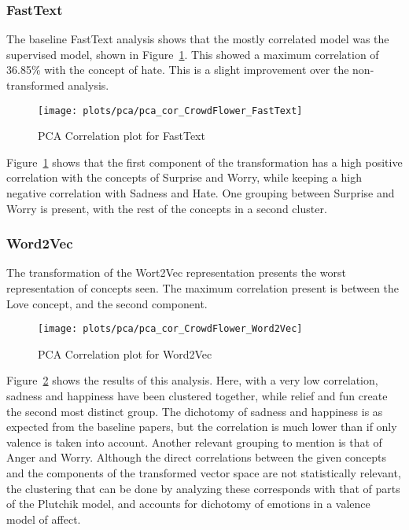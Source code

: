 \subsubsection{FastText}
The baseline FastText analysis shows that the mostly correlated model was the supervised model, shown in Figure~\ref{fig:pca_cor_CrowdFlower_FastText}. This showed a maximum correlation of 36.85\% with the concept of hate. This is a slight improvement over the non-transformed analysis.
\begin{figure}[H]
  \texttt{[image: plots/pca/pca\_cor\_CrowdFlower\_FastText]}
  \centering
  \caption{PCA Correlation plot for FastText}\label{fig:pca_cor_CrowdFlower_FastText}
\end{figure}
Figure~\ref{fig:pca_cor_CrowdFlower_FastText} shows that the first component of the transformation has a high positive correlation with the concepts of Surprise and Worry, while keeping a high negative correlation with Sadness and Hate. One grouping between Surprise and Worry is present, with the rest of the concepts in a second cluster.

\subsubsection{Word2Vec}
The transformation of the Wort2Vec representation presents the worst representation of concepts seen. The maximum correlation present is between the Love concept, and the second component.
\begin{figure}[H]
  \texttt{[image: plots/pca/pca\_cor\_CrowdFlower\_Word2Vec]}
  \centering
  \caption{PCA Correlation plot for Word2Vec}\label{fig:pca_cor_CrowdFlower_Word2Vec}
\end{figure}
Figure~\ref{fig:pca_cor_CrowdFlower_Word2Vec} shows the results of this analysis. Here, with a very low correlation, sadness and happiness have been clustered together, while relief and fun create the second most distinct group. The dichotomy of sadness and happiness is as expected from the baseline papers, but the correlation is much lower than if only valence is taken into account.
Another relevant grouping to mention is that of Anger and Worry. Although the direct correlations between the given concepts and the components of the transformed vector space are not statistically relevant, the clustering that can be done by analyzing these corresponds with that of parts of the Plutchik model, and accounts for dichotomy of emotions in a valence model of affect.

